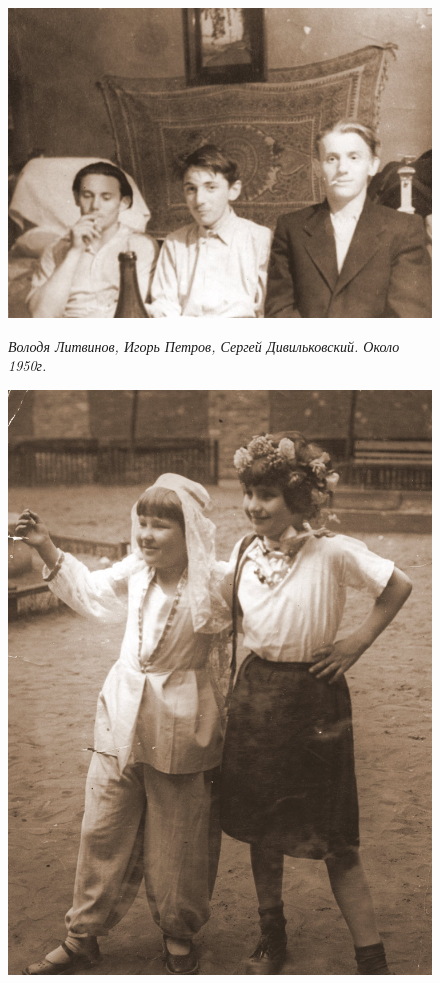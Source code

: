 \begin{figure}
    \begin{minipage}[h!]{49mm}
        \includegraphics[width=\linewidth]{inc/15/2}
        \begin{footnotesize}\textit{Володя Литвинов, Игорь Петров, Сергей Дивильковский. Около 1950г.}\end{footnotesize}
    \end{minipage}
    \hspace{5pt}
    \begin{minipage}[h!]{25mm}
        \includegraphics[width=\linewidth]{inc/15/3}

\end{minipage}
\end{figure}
